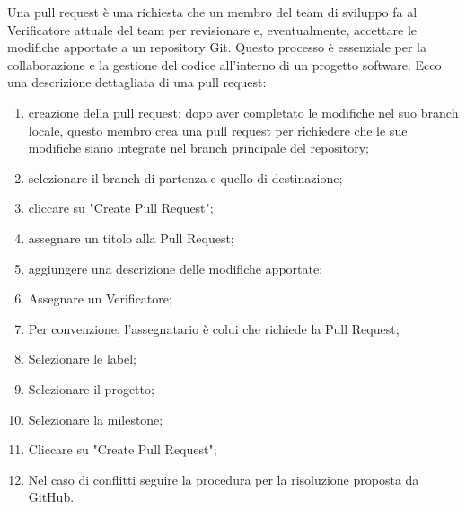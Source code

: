  \label{pull_request}
Una pull request è una richiesta che un membro del team di sviluppo fa al Verificatore attuale del team per revisionare e, eventualmente, accettare le modifiche apportate a un repository Git. Questo processo è essenziale per la collaborazione e la gestione del codice all'interno di un progetto software. Ecco una descrizione dettagliata di una pull request:
\begin{enumerate}
	\item creazione della pull request: dopo aver completato le modifiche nel suo branch locale, questo membro crea una pull request per richiedere che le sue modifiche siano integrate nel branch principale del repository;
	\item selezionare il branch di partenza e quello di destinazione;
	\item cliccare su "Create Pull Request";
	\item assegnare un titolo alla Pull Request;
	\item aggiungere una descrizione delle modifiche apportate;
	\item Assegnare un Verificatore;
	\item Per convenzione, l'assegnatario è colui che richiede la Pull Request;
	\item Selezionare le label;
	\item Selezionare il progetto;
	\item Selezionare la milestone;
	\item Cliccare su "Create Pull Request";
	\item Nel caso di conflitti seguire la procedura per la risoluzione proposta da GitHub.
\end{enumerate}

